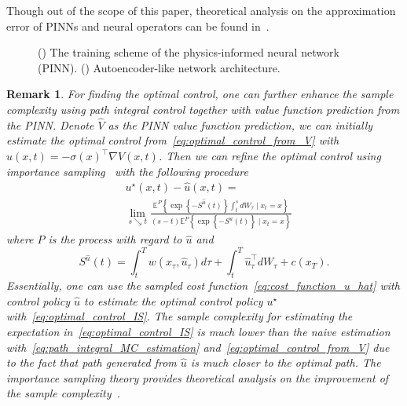 \documentclass[letterpaper]{article} %
\newtheorem{remark}[theorem]{Remark}
\begin{document}
Though out of the scope of this paper, theoretical analysis on the approximation error of PINNs and neural operators can be found in~\cite{wang2023generalizable, lu2021learning, kovachki2021universal}.

\begin{figure}[t]
\begin{subfigure}[t]{0.65\textwidth}
\centering

\label{fig:PINN diagram}
\end{subfigure}
\hfill
\begin{subfigure}[t]{0.35\textwidth}
\centering
{}

\label{fig:AE diagram}
\end{subfigure}
\caption{() The training scheme of the physics-informed neural network (PINN).
        () Autoencoder-like network architecture.}
\end{figure}


\begin{remark}
For finding the optimal control, one can further enhance the sample complexity using path integral control together with value function prediction from the PINN. Denote $\hat{V}$ as the PINN value function prediction, we can initially estimate the optimal control from~\eqref{eq:optimal_control_from_V} with $\hat{u}(x,t) =  -\sigma\left(x\right)^\top \nabla \hat{V}\left(x, t\right)$. Then we can refine the optimal control using importance sampling~\cite{thijssen2015path} with the following procedure
\begin{equation}
\label{eq:optimal_control_IS}
\begin{aligned}
& u^{\star}(x, t)-\hat{u}(x, t)= \\
& \lim _{s \searrow t} \frac{\mathbb{E}^{P}\left\{\exp \left\{-S^{\hat{u}}(t)\right\} \int_t^s d W_\tau \mid x_t=x\right\}}{(s-t) \mathbb{E}^{P}\left\{\exp \left\{-S^{\hat{u}}(t)\right\} \mid x_t=x\right\}}
\end{aligned}
\end{equation}
where $P$ is the process with regard to $\hat{u}$ and
\begin{equation}
\label{eq:cost_function_u_hat}
    S^{\hat{u}}(t)=\int_t^T w\left(x_\tau, \hat{u}_\tau\right)
    d \tau+\int_t^T \hat{u}_\tau^{\top} d W_\tau+c\left(x_T\right).
\end{equation}
Essentially, one can use the sampled cost function~\eqref{eq:cost_function_u_hat} with control policy $\hat{u}$ to estimate the optimal control policy $u^\star$ with~\eqref{eq:optimal_control_IS}. The sample complexity for estimating the expectation in~\eqref{eq:optimal_control_IS} is much lower than the naive estimation with~\eqref{eq:path_integral_MC_estimation} and~\eqref{eq:optimal_control_from_V} due to the fact that path generated from $\hat{u}$ is much closer to the optimal path. The importance sampling theory provides theoretical analysis on the improvement of the sample complexity~\cite{thijssen2015path}.

\end{remark}
\end{document}
